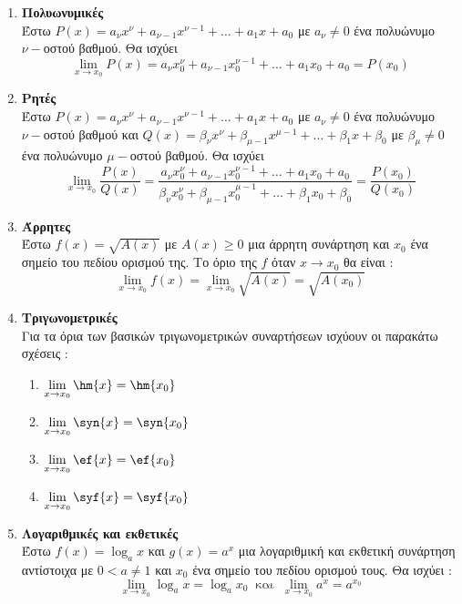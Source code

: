 \documentclass[twoside,11pt,a4paper,openany]{book}
\begin{document}
\begin{enumerate}
\item \textbf{Πολυωνυμικές}\\
Έστω $ P(x)=a_\nu x^\nu+a_{\nu-1}x^{\nu-1}+\ldots+a_1x+a_0 $ με $ a_\nu\neq0 $ ένα πολυώνυμο $ \nu- $οστού βαθμού. Θα ισχύει
\[ \lim_{x\rightarrow x_0}{P(x)}=a_\nu x^\nu_0+a_{\nu-1}x^{\nu-1}_0+\ldots+a_1x_0+a_0=P(x_0) \]
\item \textbf{Ρητές}\\
Έστω $ P(x)=a_\nu x^\nu+a_{\nu-1}x^{\nu-1}+\ldots+a_1x+a_0 $ με $ a_\nu\neq0 $ ένα πολυώνυμο $ \nu- $οστού βαθμού και $ Q(x)=\beta_\nu x^\nu+\beta_{\mu-1}x^{\mu-1}+\ldots+\beta_1x+\beta_0 $ με $ \beta_\mu\neq0 $ ένα πολυώνυμο $ \mu- $οστού βαθμού. Θα ισχύει
\[ \lim_{x\rightarrow x_0}{\frac{P(x)}{Q(x)}}=\frac{a_\nu x^\nu_0+a_{\nu-1}x^{\nu-1}_0+\ldots+a_1x_0+a_0}{\beta_\nu x^\nu_0+\beta_{\mu-1}x^{\mu-1}_0+\ldots+\beta_1x_0+\beta_0}=\frac{P(x_0)}{Q(x_0)} \]
\item \textbf{Άρρητες}\\
Έστω $ f(x)=\sqrt{A(x)} $ με $ A(x)\geq0 $ μια άρρητη συνάρτηση και $ x_0 $ ένα σημείο του πεδίου ορισμού της. Το όριο της $ f $ όταν $ x\to x_0 $ θα είναι :
\[ \lim_{x\to x_0}{f(x)}=\lim_{x\to x_0}{\sqrt{A(x)}}=\sqrt{A(x_0)} \]
\item \textbf{Τριγωνομετρικές}\\
Για τα όρια των βασικών τριγωνομετρικών συναρτήσεων ισχύουν οι παρακάτω σχέσεις :
\begin{multicols}{2}
\begin{enumerate}[label=\roman*.]
\item $ \displaystyle{\lim_{x\rightarrow x_0}{\hm{x}}=\hm{x_0}} $
\item $ \displaystyle{\lim_{x\rightarrow x_0}{\syn{x}}=\syn{x_0}} $
\item $ \displaystyle{\lim_{x\rightarrow x_0}{\ef{x}}=\ef{x_0}} $
\item $ \displaystyle{\lim_{x\rightarrow x_0}{\syf{x}}=\syf{x_0}} $
\end{enumerate}
\end{multicols}
\item \textbf{Λογαριθμικές και εκθετικές}\\
Έστω $ f(x)=\log_{a}{x} $ και $ g(x)=a^x $ μια λογαριθμική και εκθετική συνάρτηση αντίστοιχα με $ 0<a\neq 1 $ και $ x_0 $ ένα σημείο του πεδίου ορισμού τους. Θα ισχύει :
\[ \lim_{x\to x_0}{\log_{a}{x}}=\log_{a}{x_0}\ \textrm{ και }\ \lim_{x\to x_0}{a^x}=a^{x_0} \]
\end{enumerate}
\end{document}
